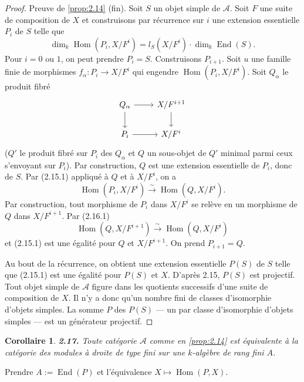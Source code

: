 \documentclass[12pt,a4paper]{article}
\theoremstyle{plain}
\newtheorem{corollary}[theorem]{Corollaire}
\theoremstyle{definition}
\theoremstyle{remark}
\DeclareMathOperator{\Hom}{Hom}
\DeclareMathOperator{\End}{End}
\begin{document}
\begin{proof}
Preuve de \ref{prop:2.14} (fin). Soit $S$ un objet simple de $\mathcal{A}$. Soit $F$ une suite de composition de $X$ et construisons par récurrence sur $i$ une extension essentielle $P_i$ de $S$ telle que
\begin{equation}\label{eq:2.16.1}
\dim_k \Hom(P_i, X/F^i) = l_S(X/F^i) \cdot \dim_k \End(S).
\end{equation}
Pour $i = 0$ ou $1$, on peut prendre $P_i = S$. Construisons $P_{i+1}$. Soit $u$ une famille finie de morphismes $f_\alpha : P_i \to X/F^i$ qui engendre $\Hom(P_i, X/F^i)$. Soit $Q_\alpha$ le produit fibré
\[
\begin{tikzcd}
Q_\alpha \arrow[r] \arrow[d] & X/F^{i+1} \arrow[d] \\
P_i \arrow[r] & X/F^i
\end{tikzcd}
\]
($Q'$ le produit fibré sur $P_i$ des $Q_\alpha$ et $Q$ un sous-objet de $Q'$ minimal parmi ceux s'envoyant sur $P_i$). Par construction, $Q$ est une extension essentielle de $P_i$, donc de $S$. Par (2.15.1) appliqué à $Q$ et à $X/F^i$, on a
\[
\Hom(P_i, X/F^i) \xrightarrow{\sim} \Hom(Q, X/F^i).
\]
Par construction, tout morphisme de $P_i$ dans $X/F^i$ se relève en un morphisme de $Q$ dans $X/F^{i+1}$. Par (2.16.1)
\[
\Hom(Q, X/F^{i+1}) \xrightarrow{\sim} \Hom(Q, X/F^i)
\]
et (2.15.1) est une égalité pour $Q$ et $X/F^{i+1}$. On prend $P_{i+1} = Q$.

Au bout de la récurrence, on obtient une extension essentielle $P(S)$ de $S$ telle que (2.15.1) est une égalité pour $P(S)$ et $X$. D'après 2.15, $P(S)$ est projectif. Tout objet simple de $\mathcal{A}$ figure dans les quotients successifs d'une suite de composition de $X$. Il n'y a donc qu'un nombre fini de classes d'isomorphie d'objets simples. La somme $P$ des $P(S)$ --- un par classe d'isomorphie d'objets simples --- est un générateur projectif.
\end{proof}

\begin{corollary}\label{cor:2.17}
\textbf{2.17.} Toute catégorie $\mathcal{A}$ comme en \ref{prop:2.14} est équivalente à la catégorie des modules à droite de type fini sur une $k$-algèbre de rang fini $A$.
\end{corollary}

Prendre $A := \End(P)$ et l'équivalence $X \mapsto \Hom(P,X)$.

\subsection{}
\end{document}
